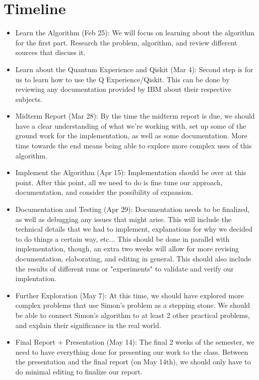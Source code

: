\documentclass[11pt]{article}
\begin{document}
\section*{Timeline}
\label{sec:timeline}

\begin{itemize}[nosep]
  \item Learn the Algorithm (Feb 25): We will focus on learning about the algorithm for the first part. Research the problem, algorithm, and review different sources that discuss it. \newline
  \item Learn about the Quantum Experience and Qiskit (Mar 4): Second step is for us to learn how to use the Q Experience/Qiskit. This can be done by reviewing any documentation provided by IBM about their respective subjects. \newline
  \item Midterm Report (Mar 28): By the time the midterm report is due, we should have a clear understanding of what we're working with, set up some of the ground work for the implementation, as well as some documentation. More time towards the end means being able to explore more complex uses of this algorithm. \newline
  \item Implement the Algorithm (Apr 15): Implementation should be over at this point. After this point, all we need to do is fine tune our approach, documentation, and consider the possibility of expansion. \newline
  \item Documentation and Testing (Apr 29): Documentation needs to be finalized, as well as debugging any issues that might arise. This	will include the technical details that we had to implement, explanations for why we decided to do things a certain way, 	etc... This should be done in parallel with implementation, though, an extra two weeks will allow for more revising 
  	documentation, elaborating, and editing in general. This should also include the results of different runs or "experiments" to validate and verify our implentation. \newline \break
\item Further Exploration (May 7): At this time, we should have explored more complex problems that use Simon's problem
	as a stepping stone. We should be able to connect Simon's algorithm to at least 2 other practical problems, and explain their significance in the real world. \newline
  \item Final Report + Presentation (May 14): The final 2 weeks of the semester, we need to have everything done 
  	for presenting our work to the class. Between the presentation and the final report (on May 14th), we should only
	have to do minimal editing to finalize our report. 
\end{itemize}
\end{document}

